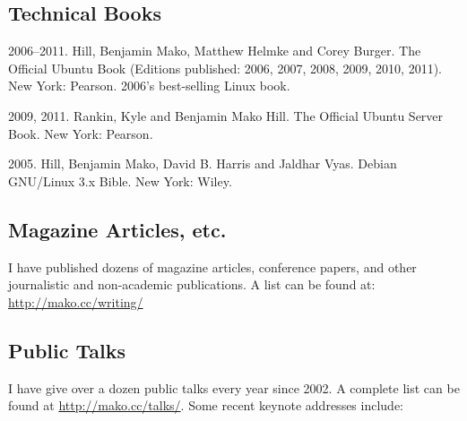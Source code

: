 \documentclass[10pt]{article}
\newenvironment{cvlist}{
\begin{list}{}{\leftmargin=3.0em \itemindent=-3.0em}
  \setlength{\itemsep}{0pt}
  \setlength{\parskip}{0em}
  \setlength{\parsep}{1em}
  \setlength{\parindent}{0em}}
{\vspace{1em}
\end{list}}
\begin{document}
\subsection{Technical Books}
\begin{cvlist}
\item 2006--2011. Hill, Benjamin Mako, Matthew Helmke and Corey
  Burger. The Official Ubuntu Book (Editions published: 2006, 2007,
  2008, 2009, 2010, 2011). New York: Pearson. 2006's best-selling Linux book.
\item 2009, 2011. Rankin, Kyle and Benjamin Mako Hill. The Official Ubuntu
  Server Book. New York: Pearson.
\item 2005. Hill, Benjamin Mako, David B. Harris and Jaldhar
  Vyas. Debian GNU/Linux 3.x Bible. New York: Wiley.
\end{cvlist}

\subsection{Magazine Articles, etc.}
I have published dozens of magazine articles, conference papers, and
other journalistic and non-academic publications. A list can be found
at: \url{http://mako.cc/writing/}

\vspace{2.5em}

\subsection{Public Talks}
I have give over a dozen public talks every year since 2002. A
complete list can be found at \url{http://mako.cc/talks/}. Some recent
keynote addresses include:
\end{document}
